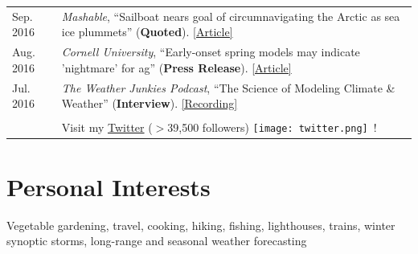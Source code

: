 \documentclass[margin,line,palatino,courier,10pt]{res}
\begin{document}
\begin{resume}
\begin{tabular}{@{}p{0.9in}p{4in}}
Sep. 2016 & \textit{Mashable}, ``Sailboat nears goal of circumnavigating the Arctic as sea ice plummets'' (\textbf{Quoted}). \href{http://mashable.com/2016/09/01/sailboat-arctic-ice-melt-open-water/#s7nzft8m6sqB}{[Article]}\\
Aug. 2016 & \textit{Cornell University}, ``Early-onset spring models may indicate 'nightmare' for ag'' (\textbf{Press Release}). \href{http://www.news.cornell.edu/stories/2016/08/early-onset-spring-models-may-indicate-nightmare-ag}{[Article]}\\
Jul. 2016 & \textit{The Weather Junkies Podcast}, ``The Science of Modeling Climate \& Weather'' (\textbf{Interview}). \href{https://www.youtube.com/watch?v=vgT5P9zC91U}{[Recording]}\\\\

& Visit my \href{https://twitter.com/ZLabe}{Twitter} ($>$39,500 followers) \texttt{[image: twitter.png]}\ !\\
\end{tabular}

\vspace{-0.1in}
\noindent\textcolor{Cerulean}{\makebox[\linewidth][r]{\rule{\textwidth}{5pt}}}
\vspace{-0.3in}
\section{\sc \textcolor{Cerulean}{\large{\textbf{Personal Interests}}}}
Vegetable gardening, travel, cooking, hiking, fishing, lighthouses, trains, winter synoptic storms, long-range and seasonal weather forecasting

\end{resume}
\end{document}
